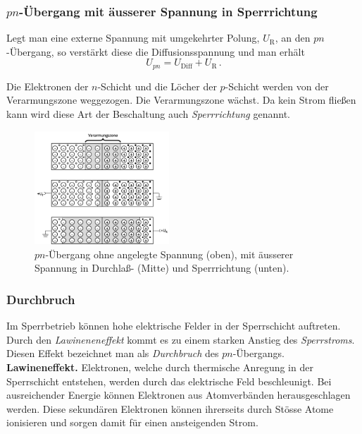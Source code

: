 \subsubsection{$pn$-\"Ubergang mit \"ausserer Spannung in Sperrrichtung}

Legt man eine externe Spannung mit umgekehrter Polung,
$U_{\mathrm{R}}$, an den $pn$-\"Ubergang, so verst\"arkt diese die
Diffusionsspannung und man erh\"alt
%
\begin{equation}
U_{pn} = U_{\mathrm{Diff}} + U_{\mathrm{R}} \, .
\end{equation}

Die Elektronen der $n$-Schicht und die L\"ocher der $p$-Schicht werden
von der Verarmungszone weggezogen. Die Verarmungszone w\"achst. Da
kein Strom fließen kann wird diese Art der Beschaltung auch {\it
Sperrrichtung} genannt.

\begin{figure}[ht!]
\begin{center}
\includegraphics[width=0.45\textwidth]{Abbildungen/pn_Uebergang.jpg}
\end{center}
\caption{$pn$-\"Ubergang ohne angelegte Spannung (oben), mit \"ausserer Spannung in Durchlaß- (Mitte) und Sperrrichtung (unten).}
\label{fig:Verarmung}
\end{figure}

\subsubsection{Durchbruch}

Im Sperrbetrieb k\"onnen hohe elektrische Felder in der Sperrschicht
auftreten. Durch den {\it Lawineneneffekt} kommt
es zu einem starken Anstieg des {\it Sperrstroms}. Diesen Effekt bezeichnet 
man als {\it Durchbruch} des $pn$-\"Ubergangs.\\

\noindent
\textbf{Lawineneffekt.} 
%
Elektronen, welche durch thermische Anregung in der Sperrschicht entstehen,
werden durch das elektrische Feld beschleunigt. Bei ausreichender
Energie k\"onnen Elektronen aus Atomverb\"anden herausgeschlagen
werden. Diese sekund\"aren Elektronen k\"onnen ihrerseits durch
St\"osse Atome ionisieren und sorgen damit f\"ur einen ansteigenden
Strom.

